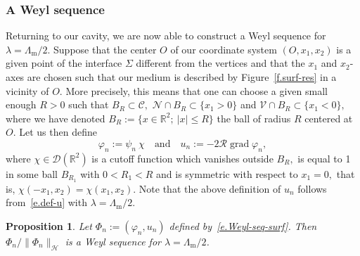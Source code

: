 \documentclass[11pt]{article}
\newtheorem{prop}[theo]{Proposition}
\theoremstyle{definition}
\numberwithin{equation}{section}
\numberwithin{figure}{section}
\numberwithin{table}{section}
\DeclareMathOperator{\grad}{grad}
\newcommand{\calC}{\mathcal{C}}
\newcommand{\calD}{\mathcal{D}}
\newcommand{\calH}{\mathcal{H}}
\newcommand{\calN}{\mathcal{N}}
\newcommand{\calR}{\mathcal{R}}
\newcommand{\calV}{\mathcal{V}}
\newcommand{\bbR}{\mathbb{R}}
\newcommand{\Lm}{{\Lambda_{\mathrm{m}}}}
\begin{document}
\subsubsection{A Weyl sequence}
Returning to our cavity, we are now able to construct a Weyl sequence for\linebreak$\lambda = \Lm/2$. Suppose that the center $O$ of our coordinate system $(O,x_1,x_2)$ is a given point of the interface $\Sigma$ different from the vertices and that the $x_1$ and $x_2$-axes are chosen such that our medium is described by Figure~\ref{f.surf-res} in a vicinity of $O.$ More precisely, this means that one can choose a given small enough $R>0$ such that $B_R \subset \calC,$ $\calN \cap B_R \subset \{x_1 > 0\}$ and $\calV \cap B_R \subset \{x_1 < 0\},$ where we have denoted $B_R := \{ x \in \bbR^2;\ |x| \le R \}$ the ball of radius $R$ centered at $O.$ Let us then define
\begin{equation}\label{e.Weyl-seq-surf}
\varphi_n := \psi_n \ \chi
\quad\text{and}\quad u_n := -2 \calR \grad \varphi_n,
\end{equation}
where $\chi \in \calD(\bbR^2)$ is a cutoff function which vanishes outside $B_R,$ is equal to 1 in some ball $B_{R_1}$ with $0 < R_1 < R$ and is symmetric with respect to $x_1=0,$ that is, $\chi(-x_1,x_2) = \chi(x_1,x_2).$ Note that the above definition of $u_n$ follows from~\eqref{e.def-u} with $\lambda=\Lm/2$.

\begin{prop}\label{p-Weyl-surface}
Let $\Phi_n := (\varphi_n,u_n)$ defined by~\eqref{e.Weyl-seq-surf}. Then $\Phi_n/\|\Phi_n\|_\calH$ is a Weyl sequence for $\lambda = \Lm/2$.
\end{prop}
\end{document}
